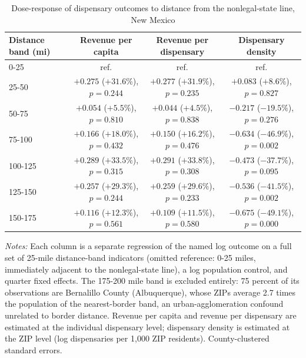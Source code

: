 \begin{table}[htbp]
\centering
\caption{Dose-response of dispensary outcomes to distance from the nonlegal-state line, New Mexico}
\label{tab:nm_doseresponse}
\footnotesize
\begin{tabular}{lccc}
\toprule
Distance band (mi) & Revenue per capita & Revenue per dispensary & Dispensary density \\
\midrule
0-25 & ref. & ref. & ref. \\
25-50 & $+0.275$ ($+31.6\%$), $p=0.244$ & $+0.277$ ($+31.9\%$), $p=0.235$ & $+0.083$ ($+8.6\%$), $p=0.827$ \\
50-75 & $+0.054$ ($+5.5\%$), $p=0.810$ & $+0.044$ ($+4.5\%$), $p=0.838$ & $-0.217$ ($-19.5\%$), $p=0.276$ \\
75-100 & $+0.166$ ($+18.0\%$), $p=0.432$ & $+0.150$ ($+16.2\%$), $p=0.476$ & $-0.634$ ($-46.9\%$), $p=0.002$ \\
100-125 & $+0.289$ ($+33.5\%$), $p=0.315$ & $+0.291$ ($+33.8\%$), $p=0.308$ & $-0.473$ ($-37.7\%$), $p=0.095$ \\
125-150 & $+0.257$ ($+29.3\%$), $p=0.244$ & $+0.259$ ($+29.6\%$), $p=0.233$ & $-0.536$ ($-41.5\%$), $p=0.002$ \\
150-175 & $+0.116$ ($+12.3\%$), $p=0.561$ & $+0.109$ ($+11.5\%$), $p=0.580$ & $-0.675$ ($-49.1\%$), $p=0.000$ \\
\bottomrule
\end{tabular}
\begin{minipage}{0.98\textwidth}
\vspace{0.3em}
\footnotesize
\textit{Notes:} Each column is a separate regression of the named log outcome on a full set of 25-mile
distance-band indicators (omitted reference: 0-25 miles, immediately adjacent to the nonlegal-state line), a
log population control, and quarter fixed effects. The 175-200 mile band is excluded entirely: 75 percent of
its observations are Bernalillo County (Albuquerque), whose ZIPs average 2.7 times the population of the
nearest-border band, an urban-agglomeration confound unrelated to border distance. Revenue per capita and
revenue per dispensary are estimated at the individual dispensary level; dispensary density is estimated at
the ZIP level (log dispensaries per 1,000 ZIP residents). County-clustered standard errors.
\end{minipage}
\end{table}
